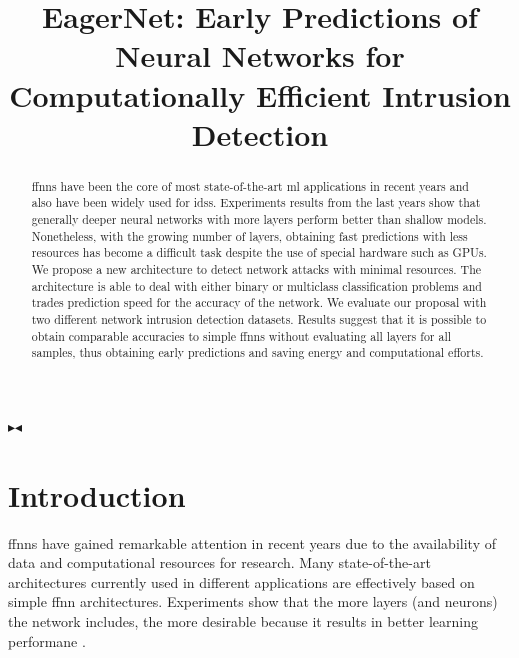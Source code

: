 \documentclass[conference]{IEEEtran}
\newcommand{\mynote}[3]{
    \fbox{\bfseries\sffamily\scriptsize#1}
    {\small$\blacktriangleright$\textsf{\emph{\color{#3}{#2}}}$\blacktriangleleft$}}
\newcommand{\todo}[1]{\mynote{TODO}{#1}{red}}
\begin{document}
\title{EagerNet: Early Predictions of Neural Networks for Computationally Efficient Intrusion Detection}

\author{
}



\maketitle

\begin{abstract}

\glspl{ffnn} have been the core of most state-of-the-art \gls{ml} applications in recent years and also have been widely used for \glspl{ids}. Experiments results from the last years show that generally deeper neural networks with more layers perform better than shallow models. Nonetheless, with the growing number of layers, obtaining fast predictions with less resources has become a difficult task despite the use of special hardware such as GPUs. We propose a new architecture to detect network attacks with minimal resources. The architecture is able to deal with either binary or multiclass classification problems and trades prediction speed for the accuracy of the network. We evaluate our proposal with two different network intrusion detection datasets. Results suggest that it is possible to obtain comparable accuracies to simple \glspl{ffnn} without evaluating all layers for all samples, thus obtaining early predictions and saving energy and computational efforts.

\end{abstract}

\todo{Max: I guess you mean Fully-Connected Neural Networks (FCNNs) when you talk about FNNs? Because FNN only means that the neural network has no cycles. So also a CNN is an FNN.}

%

\section{Introduction}
\glspl{ffnn} have gained remarkable attention in recent years due to the availability of data and computational resources for research. Many state-of-the-art architectures currently used in different applications are effectively based on simple \gls{ffnn} architectures. Experiments show that the more layers (and neurons) the network includes, the more desirable because it results in better learning performane \cite{eldan_power_2016}.
\end{document}
